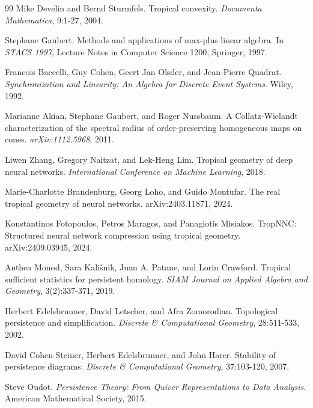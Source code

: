 \documentclass[11pt]{article}
\begin{document}
\begin{thebibliography}{99}
Mike Develin and Bernd Sturmfels.
\newblock Tropical convexity.
\newblock \emph{Documenta Mathematica}, 9:1-27, 2004.

Stephane Gaubert.
\newblock Methods and applications of max-plus linear algebra.
\newblock In \emph{STACS 1997}, Lecture Notes in Computer Science 1200, Springer, 1997.

Francois Baccelli, Guy Cohen, Geert Jan Olsder, and Jean-Pierre Quadrat.
\newblock \emph{Synchronization and Linearity: An Algebra for Discrete Event Systems}.
\newblock Wiley, 1992.

Marianne Akian, Stephane Gaubert, and Roger Nussbaum.
\newblock A Collatz-Wielandt characterization of the spectral radius of order-preserving homogeneous maps on cones.
\newblock \emph{arXiv:1112.5968}, 2011.

Liwen Zhang, Gregory Naitzat, and Lek-Heng Lim.
\newblock Tropical geometry of deep neural networks.
\newblock \emph{International Conference on Machine Learning}, 2018.

Marie-Charlotte Brandenburg, Georg Loho, and Guido Montufar.
\newblock The real tropical geometry of neural networks.
\newblock arXiv:2403.11871, 2024.

Konstantinos Fotopoulos, Petros Maragos, and Panagiotis Misiakos.
\newblock TropNNC: Structured neural network compression using tropical geometry.
\newblock arXiv:2409.03945, 2024.

Anthea Monod, Sara Kališnik, Juan A. Patane, and Lorin Crawford.
\newblock Tropical sufficient statistics for persistent homology.
\newblock \emph{SIAM Journal on Applied Algebra and Geometry}, 3(2):337-371, 2019.

Herbert Edelsbrunner, David Letscher, and Afra Zomorodian.
\newblock Topological persistence and simplification.
\newblock \emph{Discrete \& Computational Geometry}, 28:511-533, 2002.

David Cohen-Steiner, Herbert Edelsbrunner, and John Harer.
\newblock Stability of persistence diagrams.
\newblock \emph{Discrete \& Computational Geometry}, 37:103-120, 2007.

Steve Oudot.
\newblock \emph{Persistence Theory: From Quiver Representations to Data Analysis}.
\newblock American Mathematical Society, 2015.


\end{thebibliography}
\end{document}
